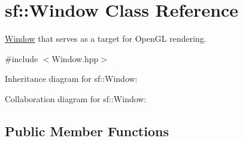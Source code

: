 \hypertarget{classsf_1_1_window}{}\section{sf\+:\+:Window Class Reference}
\label{classsf_1_1_window}


\hyperlink{classsf_1_1_window}{Window} that serves as a target for Open\+GL rendering.  




{\ttfamily \#include $<$Window.\+hpp$>$}



Inheritance diagram for sf\+:\+:Window\+:


Collaboration diagram for sf\+:\+:Window\+:
\subsection*{Public Member Functions}
